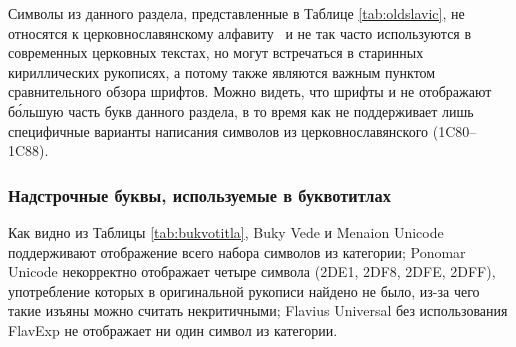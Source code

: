         Символы из данного раздела, представленные в Таблице \ref{tab:oldslavic}, не относятся к церковнославянскому алфавиту~\cite{slavonicInTexAndUnicode} и не так часто используются в современных церковных текстах, но могут встречаться в старинных кириллических рукописях, а потому также являются важным пунктом сравнительного обзора шрифтов. Можно видеть, что шрифты \flavuniversalfont{} и \ponomarunicodefont{} не отображают бо́льшую часть букв данного раздела, в то время как \bukyvedefont{} не поддерживает лишь специфичные варианты написания символов из церковнославянского (1C80--1C88).

    \subsubsection{Надстрочные буквы, используемые в буквотитлах}
        Как видно из Таблицы \ref{tab:bukvotitla}, Buky Vede и Menaion Unicode поддерживают отображение всего набора символов из категории; Ponomar Unicode некорректно отображает четыре символа (2DE1, 2DF8, 2DFE, 2DFF), употребление которых в оригинальной рукописи найдено не было, из-за чего такие изъяны можно считать некритичными; Flavius Universal без использования FlavExp не отображает ни один символ из категории.
